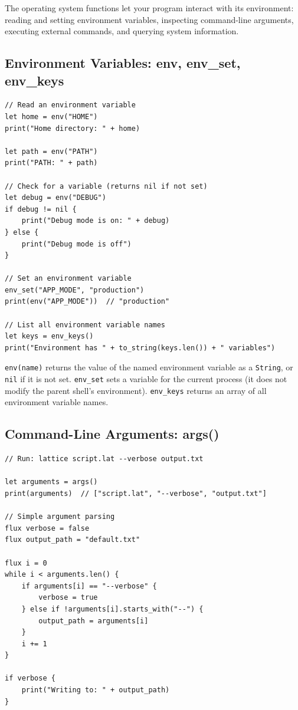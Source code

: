 The operating system functions let your program interact with its
environment: reading and setting environment variables, inspecting
command-line arguments, executing external commands, and querying system
information.

\subsection{Environment Variables: env, env\_set, env\_keys}
\label{sec:env-vars}

\begin{lstlisting}[language=Lattice, caption={Working with environment variables}]
// Read an environment variable
let home = env("HOME")
print("Home directory: " + home)

let path = env("PATH")
print("PATH: " + path)

// Check for a variable (returns nil if not set)
let debug = env("DEBUG")
if debug != nil {
    print("Debug mode is on: " + debug)
} else {
    print("Debug mode is off")
}

// Set an environment variable
env_set("APP_MODE", "production")
print(env("APP_MODE"))  // "production"

// List all environment variable names
let keys = env_keys()
print("Environment has " + to_string(keys.len()) + " variables")
\end{lstlisting}

\lstinline|env(name)| returns the value of the named environment variable as
a \lstinline|String|, or \lstinline|nil| if it is not set. \lstinline|env_set|
sets a variable for the current process (it does not modify the parent
shell's environment). \lstinline|env_keys| returns an array of all
environment variable names.

\subsection{Command-Line Arguments: args()}\label{sec:args}

\begin{lstlisting}[language=Lattice, caption={Accessing command-line arguments}]
// Run: lattice script.lat --verbose output.txt

let arguments = args()
print(arguments)  // ["script.lat", "--verbose", "output.txt"]

// Simple argument parsing
flux verbose = false
flux output_path = "default.txt"

flux i = 0
while i < arguments.len() {
    if arguments[i] == "--verbose" {
        verbose = true
    } else if !arguments[i].starts_with("--") {
        output_path = arguments[i]
    }
    i += 1
}

if verbose {
    print("Writing to: " + output_path)
}
\end{lstlisting}

